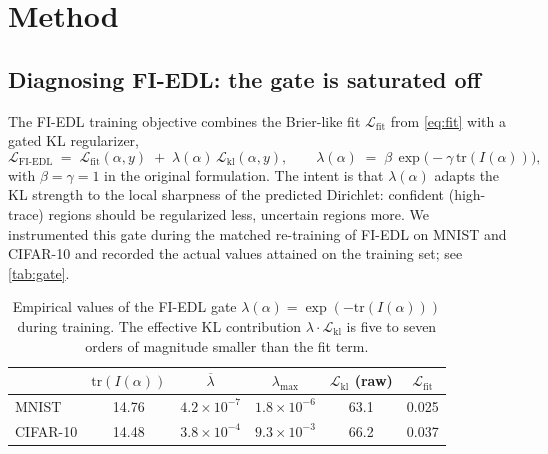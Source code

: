 \documentclass[review,5p,times]{elsarticle}
\begin{document}
\section{Method}\label{sec:method}

\subsection{Diagnosing FI-EDL: the gate is saturated off}\label{sec:diagnosis}
The FI-EDL training objective combines the Brier-like fit
$\mathcal{L}_{\text{fit}}$ from \eqref{eq:fit} with a gated KL regularizer,
\begin{equation}
  \mathcal{L}_{\text{FI-EDL}} \;=\; \mathcal{L}_{\text{fit}}(\alpha,y)
    \;+\; \lambda(\alpha)\,\mathcal{L}_{\text{kl}}(\alpha,y),
    \qquad
  \lambda(\alpha) \;=\; \beta\,\exp\!\bigl(-\gamma\,\mathrm{tr}(I(\alpha))\bigr),
  \label{eq:fiedl}
\end{equation}
with $\beta\!=\!\gamma\!=\!1$ in the original formulation. The intent is that
$\lambda(\alpha)$ adapts the KL strength to the local sharpness of the
predicted Dirichlet: confident (high-trace) regions should be regularized
less, uncertain regions more. We instrumented this gate during the matched
re-training of FI-EDL on MNIST and CIFAR-10 and recorded the actual values
attained on the training set; see \autoref{tab:gate}.

\begin{table}[t]
  \centering
  \caption{Empirical values of the FI-EDL gate
    $\lambda(\alpha)=\exp(-\mathrm{tr}(I(\alpha)))$ during training. The
    effective KL contribution $\lambda\!\cdot\!\mathcal{L}_{\text{kl}}$ is
    five to seven orders of magnitude smaller than the fit term.}
  \label{tab:gate}
  \small
  \begin{tabular}{lccccc}
    \toprule
    & $\mathrm{tr}(I(\alpha))$ & $\overline{\lambda}$ & $\lambda_{\max}$
    & $\mathcal{L}_{\text{kl}}$ (raw) & $\mathcal{L}_{\text{fit}}$ \\
    \midrule
    MNIST    & 14.76 & $4.2\!\times\!10^{-7}$ & $1.8\!\times\!10^{-6}$
             & 63.1 & 0.025 \\
    CIFAR-10 & 14.48 & $3.8\!\times\!10^{-4}$ & $9.3\!\times\!10^{-3}$
             & 66.2 & 0.037 \\
    \bottomrule
  \end{tabular}
\end{table}
\end{document}
